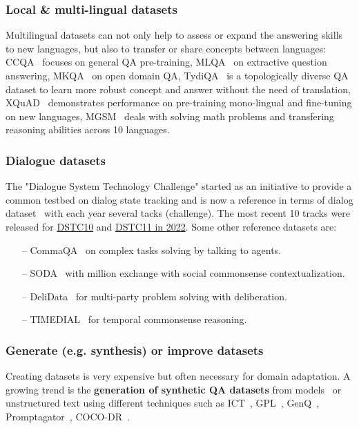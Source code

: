 \documentclass[acmsmall]{acmart}
\begin{document}
\subsubsection{Local \& multi-lingual datasets}
Multilingual datasets can not only help to assess or expand the answering skills to new languages, but also to transfer or share concepts between languages: CCQA~\citep{huberCCQANewWebScale2022} focuses on general QA pre-training, MLQA~\citep{lewisMLQAEvaluatingCrosslingual2020} on extractive question answering, MKQA~\citep{longpreMKQALinguisticallyDiverse2021} on open domain QA, TydiQA~\citep{clarkTyDiQABenchmark2020} is a topologically diverse QA dataset to learn more robust concept and answer without the need of translation, XQuAD~\citep{artetxeCrosslingualTransferabilityMonolingual2020,chiInfoXLMInformationTheoreticFramework2021} demonstrates performance on pre-training mono-lingual and fine-tuning on new languages, MGSM~\citep{shiLanguageModelsAre2022} deals with solving math problems and transfering reasoning abilities across 10 languages.

\subsubsection{Dialogue datasets}
The "Dialogue System Technology Challenge" started as an initiative to provide a common testbed on dialog state tracking and is now a reference in terms of dialog dataset~\citep{zhangAutomaticEvaluationModeration2021} with each year several tacks (challenge). The most recent 10 tracks were released for \href{https://dstc10.dstc.community/tracks}{DSTC10} and \href{https://dstc11.dstc.community/tracks}{DSTC11 in 2022}.
Some other reference datasets are:
\begin{itemize}
    \item[--] CommaQA~\citep{khotLearningSolveComplex2021} on complex tasks solving by talking to agents.
    \item[--] SODA~\citep{kimSODAMillionscaleDialogue2022} with million exchange with social commonsense contextualization.
    \item[--] DeliData~\citep{karadzhovDeliDataDatasetDeliberation2022} for multi-party problem solving with deliberation.
    \item[--] TIMEDIAL~\citep{qinTIMEDIALTemporalCommonsense2021} for temporal commonsense reasoning.
\end{itemize}

\subsubsection{Generate (e.g. synthesis) or improve datasets}
Creating datasets is very expensive but often necessary for domain adaptation. A growing trend is the \textbf{generation of synthetic QA datasets} from models~\citep{jeronymoInParsv2LargeLanguage2023} or unstructured text using different techniques such as ICT~\citep{leeLatentRetrievalWeakly2019}, GPL~\citep{wangGPLGenerativePseudo2022}, GenQ~\citep{thakurBEIRHeterogenousBenchmark2021}, Promptagator~\citep{daiPromptagatorFewshotDense2022}, COCO-DR~\citep{yuCOCODRCombatingDistribution2022}.
\end{document}
